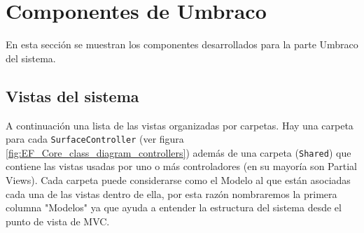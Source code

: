 \section{Componentes de Umbraco} \label{componentesUmbraco}
En esta sección se muestran los componentes desarrollados para la parte Umbraco del sistema.

\subsection{Vistas del sistema}
A continuación una lista de las vistas organizadas por carpetas. Hay una carpeta para cada \verb|SurfaceController| (ver figura \ref{fig:EF_Core_class_diagram_controllers}) además de una carpeta (\verb|Shared|) que contiene las vistas usadas por uno o más controladores (en su mayoría son Partial Views). Cada carpeta puede considerarse como el Modelo al que están asociadas cada una de las vistas dentro de ella, por esta razón nombraremos la primera columna "Modelos" ya que ayuda a entender la estructura del sistema desde el punto de vista de MVC.

